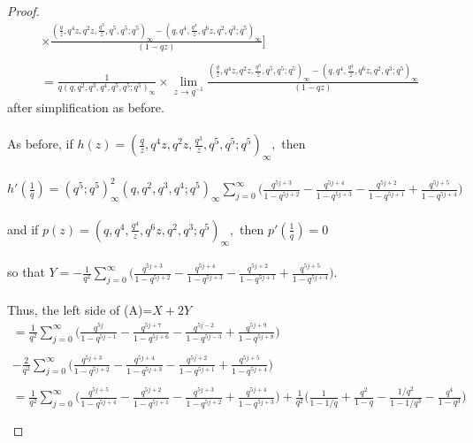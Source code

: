 \documentclass[10pt,reqno]{amsart}
\begin{document}
\begin{proof}
\begin{multline*}
\times\displaystyle\frac{(\displaystyle\frac{q}{z},q^4z,q^2z,\displaystyle\frac{q^3}{z},q^5,q^5;q^5)_{\infty}-(q,q^4,\displaystyle\frac{q^4}{z},q^6z,q^2,q^3;q^5)_{\infty}}{(1-qz)}\Bigg] \\ \\
=\displaystyle\frac{1}{q(q,q^2,q^3,q^4,q^5,q^5;q^5)_{\infty}}\times \lim_{z\to q^{-1}}\displaystyle\frac{(\displaystyle\frac{q}{z},q^4z,q^2z,\displaystyle\frac{q^3}{z},q^5,q^5;q^5)_{\infty}-(q,q^4,\displaystyle\frac{q^4}{z},q^6z,q^2,q^3;q^5)_{\infty}}{(1-qz)}
\end{multline*}
 after simplification as before. \\ \\
As before, if $h(z)=(\displaystyle\frac{q}{z},q^4z,q^2z,\displaystyle\frac{q^3}{z},q^5,q^5;q^5)_{\infty},$ then \\ \\
$h'(\displaystyle\frac{1}{q})=(q^5;q^5)_{\infty}^2(q,q^2,q^3,q^4;q^5)_{\infty}\displaystyle\sum_{j=0}^{\infty}\Bigg(\displaystyle\frac{q^{5j+3}}{1-q^{5j+2}}-\displaystyle\frac{q^{5j+4}}{1-q^{5j+3}}-\displaystyle\frac{q^{5j+2}}{1-q^{5j+1}}+\displaystyle\frac{q^{5j+5}}{1-q^{5j+4}}\Bigg)$ \\ \\
and if $p(z)=(q,q^4,\displaystyle\frac{q^4}{z},q^6z,q^2,q^3;q^5)_{\infty},$ then $p'(\displaystyle\frac{1}{q})=0$ \\ \\
so that $Y=-\displaystyle\frac{1}{q^2}\displaystyle\sum_{j=0}^{\infty}\Bigg(\displaystyle\frac{q^{5j+3}}{1-q^{5j+2}}-\displaystyle\frac{q^{5j+4}}{1-q^{5j+3}}-\displaystyle\frac{q^{5j+2}}{1-q^{5j+1}}+\displaystyle\frac{q^{5j+5}}{1-q^{5j+4}}\Bigg).$ \\ \\
Thus, the left side of (A)=$X+2Y$
\begin{multline*}
    =\displaystyle\frac{1}{q^2}\displaystyle\sum_{j=0}^{\infty}\Bigg(\displaystyle\frac{q^{5j}}{1-q^{5j-1}}-\displaystyle\frac{q^{5j+7}}{1-q^{5j+6}}-\displaystyle\frac{q^{5j-2}}{1-q^{5j-3}}+\displaystyle\frac{q^{5j+9}}{1-q^{5j+8}}\Bigg)\\ \\
    -\displaystyle\frac{2}{q^2}\displaystyle\sum_{j=0}^{\infty}\Bigg(\displaystyle\frac{q^{5j+3}}{1-q^{5j+2}}-\displaystyle\frac{q^{5j+4}}{1-q^{5j+3}}-\displaystyle\frac{q^{5j+2}}{1-q^{5j+1}}+\displaystyle\frac{q^{5j+5}}{1-q^{5j+4}}\Bigg) \\ \\
    =\displaystyle\frac{1}{q^2}\displaystyle\sum_{j=0}^{\infty}\Bigg(\displaystyle\frac{q^{5j+5}}{1-q^{5j+4}}-\displaystyle\frac{q^{5j+2}}{1-q^{5j+1}}-\displaystyle\frac{q^{5j+3}}{1-q^{5j+2}}+\displaystyle\frac{q^{5j+4}}{1-q^{5j+3}}\Bigg)+\displaystyle\frac{1}{q^2}\Bigg(\displaystyle\frac{1}{1-1/q}+\displaystyle\frac{q^2}{1-q}-\displaystyle\frac{1/q^2}{1-1/q^3}-\displaystyle\frac{q^4}{1-q^3}\Bigg) \\ \\

\end{multline*}
\end{proof}
\end{document}
